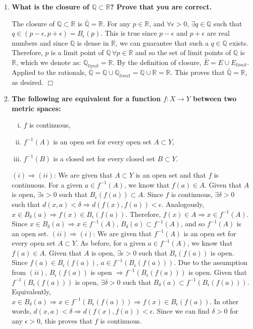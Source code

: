 \documentclass[12pt,letterpaper,reqno]{amsart}
\newcommand{\R}{\mathbb R}
\newcommand{\Q}{\mathbb Q}
\begin{document}
\begin{enumerate}[1.]
\begin{flushleft}
\end{flushleft}
\item \textbf{What is the closure of $\Q\subset \R$? Prove that you are correct.}
\begin{flushleft}
    The closure of $\Q\subset \R$ is $\bar{\Q} = \R$. For any $p \in \R$, and $\forall \epsilon > 0$, $\exists q \in \Q$ such that $q \in (p-\epsilon,p+\epsilon) = B_\epsilon(p)$. This is true since $p-\epsilon$ and $p+\epsilon$ are real numbers and since $\Q$ is dense in $\R$, we can guarantee that such a $q \in \Q$ exists. Therefore, $p$ is a limit point of $\Q \, \forall p \in \R$ and so the set of limit points of $\Q$ is $\R$, which we denote as: $\Q_{limit} = \R$. By the definition of closure, $\bar{E} = E \cup E_{limit}$. Applied to the rationals, $\bar{\Q} = \Q \cup \Q_{limit} = \Q \cup \R = \R$. This proves that $\bar{\Q} = \R$, as desired. $\Box$
\end{flushleft}
\item \textbf{The following are equivalent for a function $f: X\rightarrow Y$ between two metric spaces:}
\begin{enumerate}[(i)]
\item $f$ is continuous,
\item $f^{-1}(A)$ is an open set for every open set $A\subset Y$,
\item $f^{-1}(B)$ is a closed set for every closed set $B\subset Y$.
\end{enumerate}
\begin{flushleft}
    $(i) \Rightarrow (ii)$: We are given that $A \subset Y$ is an open set and that $f$ is continuous. For a given $a \in f^{-1}(A)$, we know that $f(a) \in A$. Given that $A$ is open, $\exists \epsilon > 0$ such that $B_\epsilon(f(a)) \subset A$. Since $f$ is continuous, $\exists \delta > 0$ such that $d(x,a) < \delta \Rightarrow d(f(x),f(a)) < \epsilon$. Analogously, $x \in B_\delta(a) \Rightarrow f(x) \in B_\epsilon(f(a))$. Therefore, $f(x) \in A \Rightarrow x \in f^{-1}(A)$. Since $x \in B_\delta(a) \Rightarrow x \in f^{-1}(A)$, $B_\delta(a) \subset f^{-1}(A)$, and so $f^{-1}(A)$ is an open set. \newline
$(ii) \Rightarrow (i)$: We are given that $f^{-1}(A)$ is an open set for every open set $A\subset Y$. As before, for a given $a \in f^{-1}(A)$, we know that $f(a) \in A$. Given that $A$ is open, $\exists \epsilon > 0$ such that $B_\epsilon(f(a))$ is open. Since $f(a) \in B_\epsilon(f(a))$, $a \in f^{-1}(B_\epsilon(f(a)))$. Due to the assumption from $(ii)$, $B_\epsilon(f(a))$ is open $\Rightarrow f^{-1}(B_\epsilon(f(a)))$ is open. Given that $ f^{-1}(B_\epsilon(f(a)))$ is open, $\exists \delta > 0$ such that $B_\delta(a) \subset f^{-1}(B_\epsilon(f(a)))$. Equivalently, $x \in B_\delta(a) \Rightarrow x \in f^{-1}(B_\epsilon(f(a))) \Rightarrow f(x) \in B_\epsilon(f(a))$. In other words, $d(x,a) < \delta \Rightarrow d(f(x),f(a)) < \epsilon$. Since we can find $\delta > 0$ for any $\epsilon > 0$, this proves that $f$ is continuous. \newline

\end{flushleft}
\end{enumerate}
\end{document}
